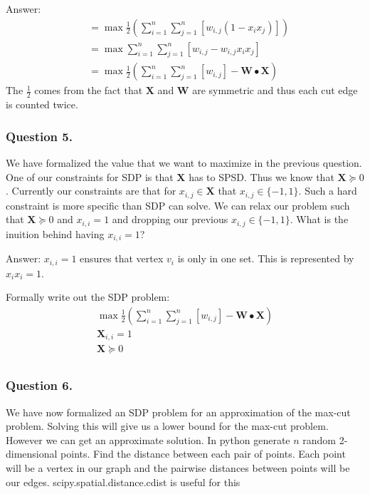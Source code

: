 \documentclass{article}
\begin{document}
Answer:
\begin{align*}
 &= \max \frac{1}{2} \left (\sum_{i = 1}^n \sum_{j = 1}^n[ w_{i, j}(1 - x_i x_j) ] \right)\\
 &= \max  \sum_{i = 1}^n \sum_{j = 1}^n[ w_{i, j} - w_{i, j} x_i x_j ]\\
 &= \max \frac{1}{2} \left ( \sum_{i = 1}^n \sum_{j = 1}^n[w_{i, j}] - \mathbf{W} \bullet \mathbf{X} \right )
\end{align*}
The \( \frac{1}{2} \) comes from the fact that \( \mathbf{X} \) and \( \mathbf{W} \) are symmetric and thus each cut edge is counted twice.

\subsubsection{Question 5.}
We have formalized the value that we want to maximize in the previous question.
One of our constraints for SDP is that \( \mathbf{X} \) has to SPSD.
Thus we know that \( \mathbf{X} \succeq 0 \).
Currently our constraints are that for \( x_{i, j} \in \mathbf{X} \) that \( x_{i, j} \in \{ -1, 1 \} \).
Such a hard constraint is more specific than SDP can solve.
We can relax our problem such that \( \mathbf{X} \succeq 0\) and \( x_{i, i} = 1 \) and dropping our previous \( x_{i, j} \in \{ -1, 1 \} \).
What is the inuition behind having \( x_{i, i} = 1 \)?

Answer: \( x_{i, i} = 1 \) ensures that vertex \( v_i \) is only in one set. This is represented by \( x_i x_i = 1 \).

Formally write out the SDP problem:
\begin{gather*}
\max \frac{1}{2} \left ( \sum_{i = 1}^n \sum_{j = 1}^n[w_{i, j}] - \mathbf{W} \bullet \mathbf{X} \right ) \\
\mathbf{X}_{i, i} = 1 \\
\mathbf{X} \succeq 0 \\
\end{gather*}

\subsubsection{Question 6.}
We have now formalized an SDP problem for an approximation of the max-cut problem. Solving this will give us a lower bound for the max-cut problem. However we can get an approximate solution.
In python generate \( n \) random 2-dimensional points.
Find the distance between each pair of points. Each point will be a vertex in our graph and the pairwise distances between points will be our edges.
scipy.spatial.distance.cdist is useful for this
\end{document}
